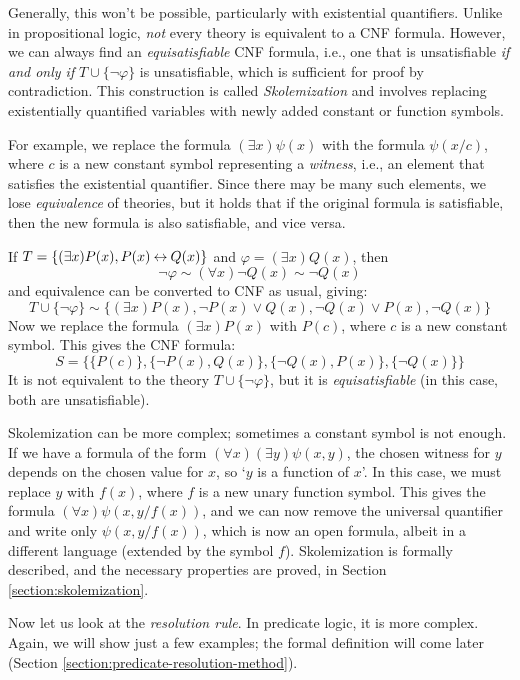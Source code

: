 Generally, this won't be possible, particularly with existential quantifiers. Unlike in propositional logic, \emph{not} every theory is equivalent to a CNF formula. However, we can always find an \emph{equisatisfiable} CNF formula, i.e., one that is unsatisfiable \emph{if and only if} $T\cup\{\neg \varphi\}$ is unsatisfiable, which is sufficient for proof by contradiction. This construction is called \emph{Skolemization} and involves replacing existentially quantified variables with newly added constant or function symbols.

For example, we replace the formula $(\exists x)\psi(x)$ with the formula $\psi(x/c)$, where $c$ is a new constant symbol representing a \emph{witness}, i.e., an element that satisfies the existential quantifier. Since there may be many such elements, we lose \emph{equivalence} of theories, but it holds that if the original formula is satisfiable, then the new formula is also satisfiable, and vice versa.

\begin{example}
  If $T=\{(\exists x)P(x),P(x)\mathbin{\leftrightarrow} Q(x)\}$ and $\varphi=(\exists x)Q(x)$, then 
  $$
  \neg\varphi\sim(\forall x)\neg Q(x)\sim\neg Q(x)
  $$
  and equivalence can be converted to CNF as usual, giving:
  $$
  T\cup\{\neg \varphi\}\sim\{(\exists x)P(x),\neg P(x)\lor Q(x),\neg Q(x)\lor P(x),\neg Q(x)\}
  $$
  Now we replace the formula $(\exists x)P(x)$ with $P(c)$, where $c$ is a new constant symbol. This gives the CNF formula:
  $$
  S = \{\{P(c)\},\{\neg P(x),Q(x)\},\{\neg Q(x),P(x)\},\{\neg Q(x)\}\}
  $$
  It is not equivalent to the theory $T\cup\{\neg \varphi\}$, but it is \emph{equisatisfiable} (in this case, both are unsatisfiable).
\end{example}

Skolemization can be more complex; sometimes a constant symbol is not enough. If we have a formula of the form $(\forall x)(\exists y)\psi(x,y)$, the chosen witness for $y$ depends on the chosen value for $x$, so `$y$ is a function of $x$'. In this case, we must replace $y$ with $f(x)$, where $f$ is a new unary function symbol. This gives the formula $(\forall x)\psi(x,y/f(x))$, and we can now remove the universal quantifier and write only $\psi(x,y/f(x))$, which is now an open formula, albeit in a different language (extended by the symbol $f$). Skolemization is formally described, and the necessary properties are proved, in Section \ref{section:skolemization}. 

Now let us look at the \emph{resolution rule}. In predicate logic, it is more complex. Again, we will show just a few examples; the formal definition will come later (Section \ref{section:predicate-resolution-method}).

